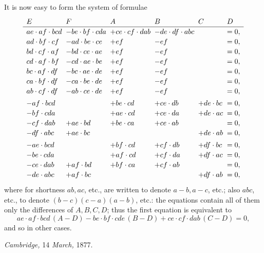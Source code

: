 \documentclass[11pt,a4paper]{article}
\begin{document}
It is now easy to form the system of formulae
\[
\renewcommand{\arraystretch}{1.15}
\begin{array}{l@{\;\;}l@{\;\;}l@{\;\;}l@{\;\;}l@{\;\;}l}
E & F & A & B & C & D\\
\hline
ae \cdot af \cdot bcd & -be \cdot bf \cdot cda & +ce \cdot cf \cdot dab & -de \cdot df \cdot abc & & = 0,\\
ad \cdot bf \cdot cf & -ad \cdot be \cdot ce & +ef & -ef & & = 0,\\
bd \cdot cf \cdot af & -bd \cdot ce \cdot ae & +ef & -ef & & = 0,\\
cd \cdot af \cdot bf & -cd \cdot ae \cdot be & +ef & -ef & & = 0,\\
bc \cdot af \cdot df & -bc \cdot ae \cdot de & +ef & -ef & & = 0,\\
ca \cdot bf \cdot df & -ca \cdot be \cdot de & +ef & -ef & & = 0,\\
ab \cdot cf \cdot df & -ab \cdot ce \cdot de & +ef & -ef & & = 0,\\[3pt]
-af \cdot bcd & & +be \cdot cd & +ce \cdot db & +de \cdot bc & = 0,\\
-bf \cdot cda & & +ae \cdot cd & +ce \cdot da & +de \cdot ac & = 0,\\
-cf \cdot dab & +ae \cdot bd & +be \cdot ca & +ce \cdot ab & & = 0,\\
-df \cdot abc & +ae \cdot bc & & & +de \cdot ab & = 0,\\[3pt]
-ae \cdot bcd & & +bf \cdot cd & +cf \cdot db & +df \cdot bc & = 0,\\
-be \cdot cda & & +af \cdot cd & +cf \cdot da & +df \cdot ac & = 0,\\
-ce \cdot dab & +af \cdot bd & +bf \cdot ca & +cf \cdot ab & & = 0,\\
-de \cdot abc & +af \cdot bc & & & +df \cdot ab & = 0,
\end{array}
\]
where for shortness $ab, ac$, etc., are written to denote $a - b, a - c$, etc.; also $abc$, etc., to denote $(b - c)(c - a)(a - b)$, etc.: the equations contain all of them only the differences of $A, B, C, D$; thus the first equation is equivalent to
\[
ae \cdot af \cdot bcd\,(A - D) - be \cdot bf \cdot cde\,(B - D) + ce \cdot cf \cdot dab\,(C - D) = 0,
\]
and so in other cases.

\medskip

\hfill \emph{Cambridge,} 14 \emph{March,} 1877.

\newpage

\end{document}
